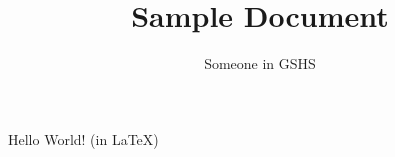 \documentclass{article}
\title{Sample Document}
\author{Someone in GSHS}
\begin{document}
\maketitle
Hello World! (in \LaTeX)
\end{document}
